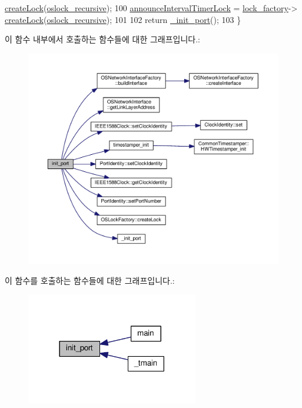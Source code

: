 \begin{DoxyCode}
      \hyperlink{class_o_s_lock_factory_ac0789ff714468962f0c1a317d7774585}{createLock}(\hyperlink{avbts__oslock_8hpp_a88e6fcd587e202a0bf3d0318d8fff8bbafd42ae3474dea6ba3413104730fb1063}{oslock\_recursive});
100     \hyperlink{class_common_port_a652fe375b2664ee0bedbc5c31a3556df}{announceIntervalTimerLock} = \hyperlink{class_common_port_a79c67e28bcaacaa0f11c04682d085b36}{lock\_factory}->
      \hyperlink{class_o_s_lock_factory_ac0789ff714468962f0c1a317d7774585}{createLock}(\hyperlink{avbts__oslock_8hpp_a88e6fcd587e202a0bf3d0318d8fff8bbafd42ae3474dea6ba3413104730fb1063}{oslock\_recursive});
101 
102     \textcolor{keywordflow}{return} \hyperlink{class_common_port_a5d364e6573c21517d6b9bd301a3f3543}{\_init\_port}();
103 \}
\end{DoxyCode}


이 함수 내부에서 호출하는 함수들에 대한 그래프입니다.\+:
\nopagebreak
\begin{figure}[H]
\begin{center}
\leavevmode
\includegraphics[width=350pt]{class_common_port_ae2f86408116b0a551da01c6f92f03ff9_cgraph}
\end{center}
\end{figure}




이 함수를 호출하는 함수들에 대한 그래프입니다.\+:
\nopagebreak
\begin{figure}[H]
\begin{center}
\leavevmode
\includegraphics[width=213pt]{class_common_port_ae2f86408116b0a551da01c6f92f03ff9_icgraph}
\end{center}
\end{figure}


